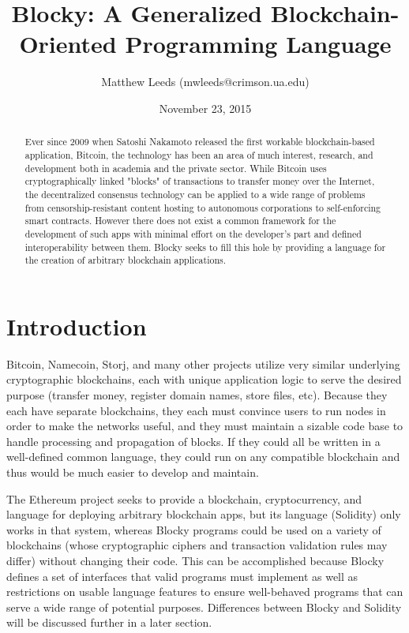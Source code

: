 \documentclass[letterpaper]{article}
\title{Blocky: A Generalized Blockchain-Oriented Programming Language}
\author{Matthew Leeds (mwleeds@crimson.ua.edu)}
\date{November 23, 2015}
\begin{document}
\maketitle

\begin{abstract}
Ever since 2009 when Satoshi Nakamoto released the first workable blockchain-based application, Bitcoin, the technology has been an area of much interest, research, and development both in academia and the private sector. While Bitcoin uses cryptographically linked "blocks" of transactions to transfer money over the Internet, the decentralized consensus technology can be applied to a wide range of problems from censorship-resistant content hosting to autonomous corporations to self-enforcing smart contracts. However there does not exist a common framework for the development of such apps with minimal effort on the developer's part and defined interoperability between them. Blocky seeks to fill this hole by providing a language for the creation of arbitrary blockchain applications.
\end{abstract}

\section{Introduction}

Bitcoin, Namecoin, Storj, and many other projects utilize very similar underlying cryptographic blockchains, each with unique application logic to serve the desired purpose (transfer money, register domain names, store files, etc). Because they each have separate blockchains, they each must convince users to run nodes in order to make the networks useful, and they must maintain a sizable code base to handle processing and propagation of blocks. If they could all be written in a well-defined common language, they could run on any compatible blockchain and thus would be much easier to develop and maintain.

The Ethereum project seeks to provide a blockchain, cryptocurrency, and language for deploying arbitrary blockchain apps, but its language (Solidity) only works in that system, whereas Blocky programs could be used on a variety of blockchains (whose cryptographic ciphers and transaction validation rules may differ) without changing their code. This can be accomplished because Blocky defines a set of interfaces that valid programs must implement as well as restrictions on usable language features to ensure well-behaved programs that can serve a wide range of potential purposes. Differences between Blocky and Solidity will be discussed further in a later section.
\end{document}
